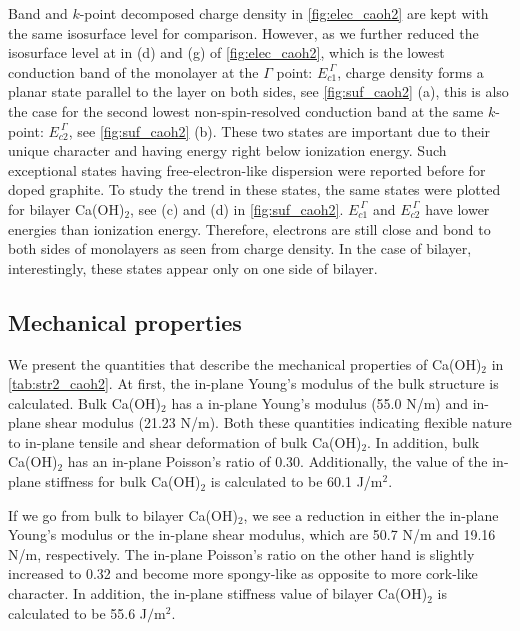 Band and $k$-point decomposed charge density in \autoref{fig:elec_caoh2} are 
kept with the same isosurface level for comparison. However, as we further 
reduced the isosurface level at  in (d) and (g) of \autoref{fig:elec_caoh2}, which is the lowest conduction band of the 
monolayer at the $\Gamma$ point: $E_{c1}^{~\Gamma}$, charge density forms a planar 
state parallel to the layer on both sides, see \autoref{fig:suf_caoh2} (a), this
is also the case for the second lowest non-spin-resolved conduction band at the same
$k$-point: $E_{c2}^{~\Gamma}$, see \autoref{fig:suf_caoh2} (b). These two states are 
important due to their unique character and having energy right below ionization energy. Such exceptional states 
having free-electron-like dispersion were reported before\cite{Posternak1,Posternak2} for 
doped graphite. To study the trend in these states, the same states were plotted 
for bilayer Ca(OH)$_2$, see (c) and (d) in \autoref{fig:suf_caoh2}. $E_{c1}^{~\Gamma}$ and $E_{c2}^{~\Gamma}$ have lower energies than ionization energy. Therefore, electrons are still close and bond to both sides of monolayers as seen from charge density. In the case of bilayer, interestingly, these states appear only on one side of bilayer.

\subsection{Mechanical properties}

We present the quantities that describe the mechanical 
properties of Ca(OH)$_2$ in \autoref{tab:str2_caoh2}. 
At first, the in-plane Young's modulus of the bulk structure is calculated. 
Bulk Ca(OH)$_2$ has a in-plane Young's modulus (55.0 N/m) and in-plane shear 
modulus (21.23 N/m). Both these quantities indicating flexible nature to in-plane 
tensile and shear deformation of bulk Ca(OH)$_2$. In addition, bulk Ca(OH)$_2$ has 
an in-plane Poisson's ratio of 0.30.  Additionally, the value of the in-plane 
stiffness for bulk Ca(OH)$_{2}$ is calculated to be 60.1 J/m$^{2}$. 

If we go from bulk to bilayer Ca(OH)$_2$, we see a reduction in either the
in-plane Young's modulus or the in-plane shear modulus, which are 50.7 N/m and 
19.16 N/m, respectively. The in-plane Poisson's ratio on the other hand is 
slightly increased to 0.32 and become more spongy-like as opposite to more 
cork-like character\cite{poisson}. In addition, the in-plane stiffness value of 
bilayer Ca(OH)$_{2}$ is calculated to be 55.6 J$/$m$^{2}$. 

